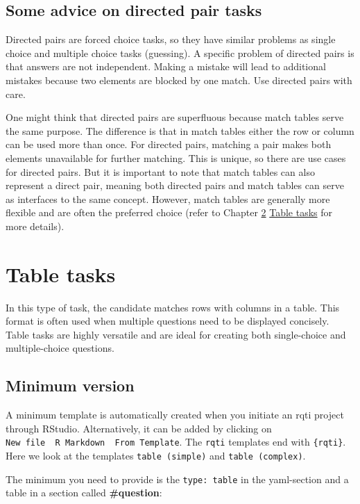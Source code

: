 \documentclass[twoside]{tufte-book}
\begin{document}
\section{Some advice on directed pair tasks}\label{some-advice-on-directed-pair-tasks}

Directed pairs are forced choice tasks, so they have similar problems as single choice and multiple choice tasks (guessing). A specific problem of directed pairs is that answers are not independent. Making a mistake will lead to additional mistakes because two elements are blocked by one match. Use directed pairs with care.

One might think that directed pairs are superfluous because match tables serve the same purpose. The difference is that in match tables either the row or column can be used more than once. For directed pairs, matching a pair makes both elements unavailable for further matching. This is unique, so there are use cases for directed pairs. But it is important to note that match tables can also represent a direct pair, meaning both directed pairs and match tables can serve as interfaces to the same concept. However, match tables are generally more flexible and are often the preferred choice (refer to Chapter \ref{table-tasks} \href{table.html}{Table tasks} for more details).

\chapter{Table tasks}\label{table-tasks}

In this type of task, the candidate matches rows with columns in a table. This format is often used when multiple questions need to be displayed concisely. Table tasks are highly versatile and are ideal for creating both single-choice and multiple-choice questions.

\section{Minimum version}\label{minimum-version-7}

A minimum template is automatically created when you initiate an rqti project through RStudio. Alternatively, it can be added by clicking on \texttt{New\ file\ \textrightarrow{}\ R\ Markdown\ \textrightarrow{}\ From\ Template}. The \texttt{rqti} templates end with \texttt{\{rqti\}}. Here we look at the templates \texttt{table\ (simple)} and \texttt{table\ (complex)}.

The minimum you need to provide is the \texttt{type:\ table} in the yaml-section and a table in a section called \textbf{\#question}:
\end{document}
